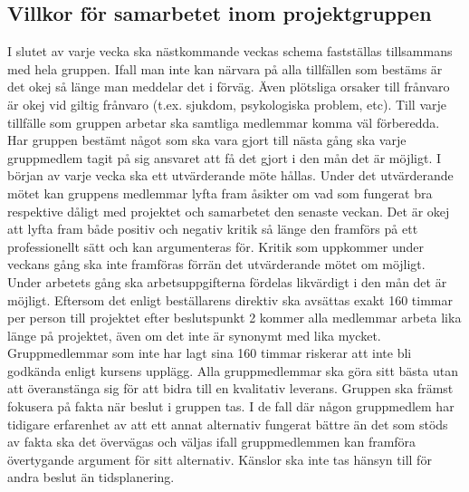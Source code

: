 \documentclass{article}
\begin{document}
\subsection{Villkor för samarbetet inom projektgruppen}
I slutet av varje vecka ska nästkommande veckas schema fastställas tillsammans med hela gruppen. Ifall man inte kan närvara på alla tillfällen som bestäms är det okej så länge man meddelar det i förväg. Även plötsliga orsaker till frånvaro är okej vid giltig frånvaro (t.ex. sjukdom, psykologiska problem, etc).
\newline\newline
Till varje tillfälle som gruppen arbetar ska samtliga medlemmar komma väl förberedda. Har gruppen bestämt något som ska vara gjort till nästa gång ska varje gruppmedlem tagit på sig ansvaret att få det gjort i den mån det är möjligt.
\newline\newline
I början av varje vecka ska ett utvärderande möte hållas. Under det utvärderande mötet kan gruppens medlemmar lyfta fram åsikter om vad som fungerat bra respektive dåligt med projektet och samarbetet den senaste veckan. Det är okej att lyfta fram både positiv och negativ kritik så länge den framförs på ett professionellt sätt och kan argumenteras för. Kritik som uppkommer under veckans gång ska inte framföras förrän det utvärderande mötet om möjligt.
\newline\newline
Under arbetets gång ska arbetsuppgifterna fördelas likvärdigt i den mån det är möjligt. Eftersom det enligt beställarens direktiv ska avsättas exakt 160 timmar per person till projektet efter beslutspunkt 2 kommer alla medlemmar arbeta lika länge på projektet, även om det inte är synonymt med lika mycket. Gruppmedlemmar som inte har lagt sina 160 timmar riskerar att inte bli godkända enligt kursens upplägg.
\newline\newline
Alla gruppmedlemmar ska göra sitt bästa utan att överanstänga sig för att bidra till en kvalitativ leverans.
\newline\newline
Gruppen ska främst fokusera på fakta när beslut i gruppen tas. I de fall där någon gruppmedlem har tidigare erfarenhet av att ett annat alternativ fungerat bättre än det som stöds av fakta ska det övervägas och väljas ifall gruppmedlemmen kan framföra övertygande argument för sitt alternativ. Känslor ska inte tas hänsyn till för andra beslut än tidsplanering.
\end{document}
